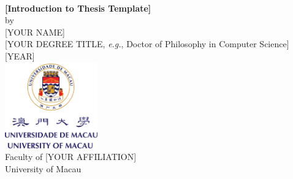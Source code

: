 %
\begin{titlepage}
    \addtolength{\hoffset}{0.5\evensidemargin-0.5\oddsidemargin} %
    \noindent%
    
    \begin{center}

        \large \textbf{   } \\[2.0cm]
        
        \begin{normalsize}
            \textbf{[Introduction to Thesis Template]}\\[1.0cm]

            by \\[1.0cm]
            {[YOUR NAME]} \\[2.0cm]
            
            {[YOUR DEGREE TITLE, \textit{e.g.}, Doctor of Philosophy in Computer Science]} \\[4.0cm]
            {[YEAR]} \\[1.5cm]
            
            \includegraphics[width=4cm]{figures/um_logo_bw_vp2.png}\\[1.0cm]
            
            Faculty of {[YOUR AFFILIATION]} \\
            University of Macau

        \end{normalsize}
    
    \end{center}
\end{titlepage}
